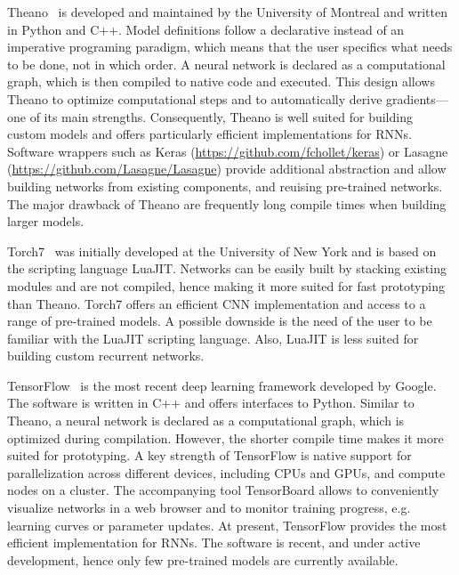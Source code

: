 Theano~\citep{bastien_theano:_2012} is developed and maintained by the University of Montreal and written in Python and C++. Model definitions follow a declarative instead of an imperative programing paradigm, which means that the user specifics what needs to be done, not in which order. A neural network is declared as a computational graph, which is then compiled to native code and executed. This design allows Theano to optimize computational steps and to automatically derive gradients—one of its main strengths. Consequently, Theano is well suited for building custom models and offers particularly efficient implementations for RNNs. Software wrappers such as Keras (\url{https://github.com/fchollet/keras}) or Lasagne (\url{https://github.com/Lasagne/Lasagne}) provide additional abstraction and allow building networks from existing components, and reuising pre-trained networks. The major drawback of Theano are frequently long compile times when building larger models.

Torch7~\citep{collobert_torch7:_2011} was initially developed at the University of New York and is based on the scripting language LuaJIT. Networks can be easily built by stacking existing modules and are not compiled, hence making it more suited for fast prototyping than Theano. Torch7 offers an efficient CNN implementation and access to a range of pre-trained models. A possible downside is the need of the user to be familiar with the LuaJIT scripting language. Also, LuaJIT is less suited for building custom recurrent networks.

TensorFlow~\citep{abadi_tensorflow:_2016} is the most recent deep learning framework developed by Google. The software is written in C++ and offers interfaces to Python. Similar to Theano, a neural network is declared as a computational graph, which is optimized during compilation. However, the shorter compile time makes it more suited for prototyping. A key strength of TensorFlow is native support for parallelization across different devices, including CPUs and GPUs, and compute nodes on a cluster. The accompanying tool TensorBoard allows to conveniently visualize networks in a web browser and to monitor training progress, e.g. learning curves or parameter updates. At present, TensorFlow provides the most efficient implementation for RNNs. The software is recent, and under active development, hence only few pre-trained models are currently available.

